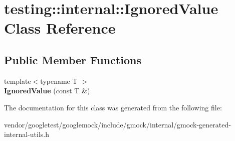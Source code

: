 \hypertarget{classtesting_1_1internal_1_1_ignored_value}{}\section{testing\+:\+:internal\+:\+:Ignored\+Value Class Reference}
\label{classtesting_1_1internal_1_1_ignored_value}
\subsection*{Public Member Functions}
\begin{DoxyCompactItemize}
\item 
\mbox{\label{classtesting_1_1internal_1_1_ignored_value_a6c72839c07a9da8d027efb253144bd91}} 
{\footnotesize template$<$typename T $>$ }\\{\bfseries Ignored\+Value} (const T \&)
\end{DoxyCompactItemize}


The documentation for this class was generated from the following file\+:\begin{DoxyCompactItemize}
\item 
vendor/googletest/googlemock/include/gmock/internal/gmock-\/generated-\/internal-\/utils.\+h\end{DoxyCompactItemize}
